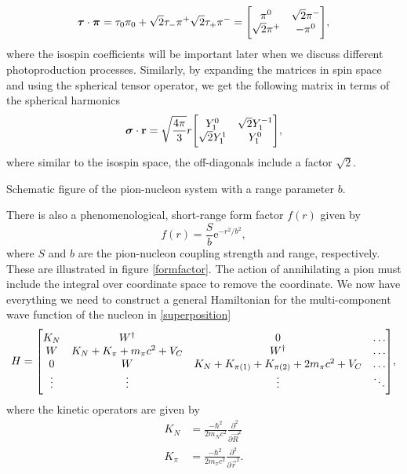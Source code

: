 \begin{equation} \label{isocoeff}
	\vec{\tau}\cdot \vec{\pi} = \tau_0  \pi_0+ \sqrt{2} \tau_{-}\pi^ +\sqrt{2}\tau_{+} \pi^{-} = \mqty[\pi^0 & \sqrt{2}\pi^- \\
	\sqrt{2}\pi^+ & -\pi^0],
\end{equation}
where the isospin coefficients will be important later when we discuss different photoproduction processes. Similarly, by expanding the matrices in spin space and using the spherical tensor operator, we get the following matrix in terms of the spherical harmonics
\begin{equation}\label{spinmatrix}
	\vec{\sigma}\cdot \vec{r} = \sqrt{\frac{4\pi}{3}} r \mqty[Y_{1}^0 & \sqrt{2}Y_1^{-1} \\ \sqrt{2}Y_1^1 & Y_1^0],
\end{equation}
where similar to the isospin space, the off-diagonals include a factor $\sqrt{2}$.  
\begin{marginfigure}
	\centering
	
	\caption{Schematic figure of the pion-nucleon system with a range parameter $b$.}
	\label{formfactor}
\end{marginfigure}
There is also a phenomenological, short-range form factor $f(r)$ \cite{AkselBook} given by
\begin{equation}\label{formfactoreq}
	f(r) = \frac{S}{b} \text{e}^{-r^2/b^2},
\end{equation}
where $S$ and $b$ are the pion-nucleon coupling strength and range, respectively. These are illustrated in figure \ref{formfactor}. The action of annihilating a pion must include the integral over coordinate space to remove the coordinate. We now have everything we need to construct a general Hamiltonian for the multi-component wave function of the nucleon in \eqref{superposition}
\begin{equation} \label{multihamiltonian}
	H = \mqty[K_N & W^\dagger & 0 &\ldots \\
	W & K_N+K_\pi+m_\pi c^2+V_C & W^\dagger & \ldots \\
	0 & W & K_N+K_{\pi(1)}+K_{\pi(2)}+2m_\pi c^2 +V_C & \ldots \\
	\vdots & \vdots & \vdots &\ddots ],
\end{equation}
where the kinetic operators are given by
\begin{align} \label{multiN}
	K_N &= \frac{-\hbar^2}{2 m_N c^2} \frac{\partial^2}{\partial \vec{R}^2} \\
	K_\pi &= \frac{-\hbar^2}{2 m_\pi c^2} \frac{\partial^2}{\partial \vec{r}^2} \label{kinpi}.
\end{align} 
